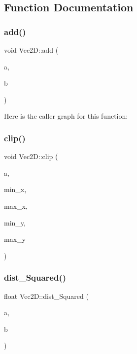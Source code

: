 \subsection{Function Documentation}
\mbox{\label{namespace_vec2_d_a758464ed31255ef60f9e5adb4ec514f5}} 
\subsubsection{\texorpdfstring{add()}{add()}}
{\footnotesize\ttfamily void Vec2\+D\+::add (\begin{DoxyParamCaption}\item[{\mbox{\hyperlink{struct_vec2_d_1_1_vec2_d}{Vec2D}} $\ast$}]{a,  }\item[{const \mbox{\hyperlink{struct_vec2_d_1_1_vec2_d}{Vec2D}} $\ast$}]{b }\end{DoxyParamCaption})\hspace{0.3cm}{\ttfamily [inline]}}

Here is the caller graph for this function\+:
\mbox{\label{namespace_vec2_d_a625a15fa457bb1aa5b693e74837cfdc3}} 
\subsubsection{\texorpdfstring{clip()}{clip()}}
{\footnotesize\ttfamily void Vec2\+D\+::clip (\begin{DoxyParamCaption}\item[{\mbox{\hyperlink{struct_vec2_d_1_1_vec2_d}{Vec2D}} $\ast$}]{a,  }\item[{float}]{min\+\_\+x,  }\item[{float}]{max\+\_\+x,  }\item[{float}]{min\+\_\+y,  }\item[{float}]{max\+\_\+y }\end{DoxyParamCaption})}

\mbox{\label{namespace_vec2_d_a7d80f189a2cd8a6b8ec4c97b381aef19}} 
\subsubsection{\texorpdfstring{dist\+\_\+\+Squared()}{dist\_Squared()}}
{\footnotesize\ttfamily float Vec2\+D\+::dist\+\_\+\+Squared (\begin{DoxyParamCaption}\item[{const \mbox{\hyperlink{struct_vec2_d_1_1_vec2_d}{Vec2D}} $\ast$}]{a,  }\item[{const \mbox{\hyperlink{struct_vec2_d_1_1_vec2_d}{Vec2D}} $\ast$}]{b }\end{DoxyParamCaption})\hspace{0.3cm}{\ttfamily [inline]}}


